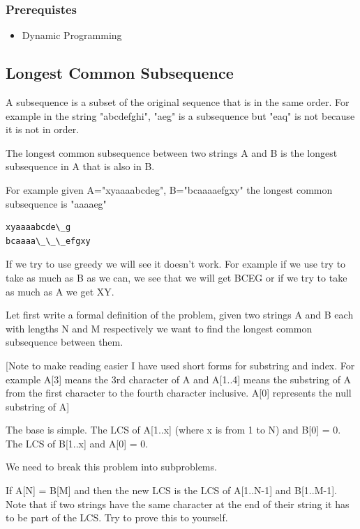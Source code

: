\documentclass[11pt,oneside]{book}
\begin{document}
\subsubsection{Prerequistes}

\begin{itemize}
\item Dynamic Programming
\end{itemize}

\subsection{Longest Common Subsequence}

A subsequence is a subset of the original sequence that is in the same order. For example in the string "abcdefghi", "aeg" is a subsequence but "eaq" is not because it is not in order.

The longest common subsequence between two strings A and B is the longest subsequence in A that is also in B.

For example given A="xyaaaabcdeg", B="bcaaaaefgxy" the longest common subsequence is "aaaaeg"

\begin{lstlisting}
xyaaaabcde\_g
bcaaaa\_\_\_efgxy
\end{lstlisting}

If we try to use greedy we will see it doesn't work. For example if we use try to take as much as B as we can, we see that we will get BCEG or if we try to take as much as A we get XY.

Let first write a formal definition of the problem, given two strings A and B each with lengths N and M respectively we want to find the longest common subsequence between them.

[Note to make reading easier I have used short forms for substring and index. For example A[3] means the 3rd character of A and A[1..4] means the substring of A from the first character to the fourth character inclusive. A[0] represents the null substring of A]

The base is simple. The LCS of A[1..x] (where x is from 1 to N) and B[0] = 0. The LCS of B[1..x] and A[0] = 0.

We need to break this problem into subproblems.

If A[N] = B[M] and then the new LCS is the LCS of A[1..N-1] and B[1..M-1]. Note that if two strings have the same character at the end of their string it has to be part of the LCS. Try to prove this to yourself.
\end{document}
